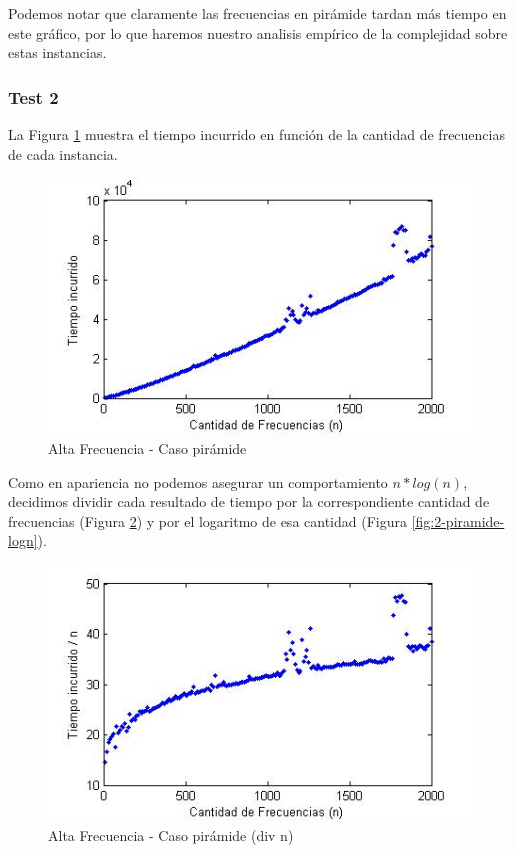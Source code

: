 Podemos notar que claramente las frecuencias en pirámide tardan más tiempo en este gráfico, por lo que haremos nuestro analisis empírico de la complejidad sobre estas instancias.

\vspace*{0.6cm}

\subsubsection{Test 2}

La Figura \ref{fig:2-piramide} muestra el tiempo incurrido en función de la cantidad de frecuencias de cada instancia.

\begin{figure}[htb]
	\begin{center}
    		\includegraphics[scale=0.5]{imagenes/2-tren.jpg}
	\end{center}
	\caption{Alta Frecuencia - Caso pirámide}\label{fig:2-piramide}
\end{figure}

Como en apariencia no podemos asegurar un comportamiento $n*log(n)$, decidimos dividir cada resultado de tiempo por la correspondiente cantidad de frecuencias (Figura \ref{fig:2-piramide-n}) y por el logaritmo de esa cantidad (Figura \ref{fig:2-piramide-logn}).

\begin{figure}[htb]
	\begin{center}
    		\includegraphics[scale=0.5]{imagenes/2-tren-div-n.jpg}
	\end{center}
	\caption{Alta Frecuencia - Caso pirámide (div n)}\label{fig:2-piramide-n}
\end{figure}

